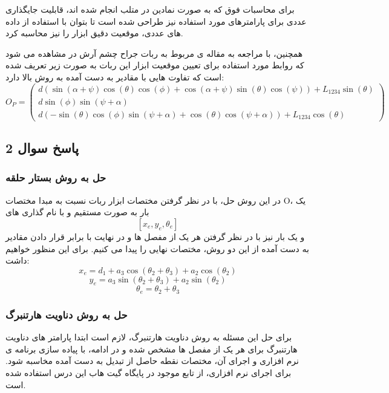 برای محاسبات فوق که به صورت نمادین در متلب انجام شده اند، قابلیت جایگذاری عددی برای پارامترهای مورد استفاده نیز طراحی شده است تا بتوان با استفاده از داده های عددی، موقعیت دقیق ابزار را نیز محاسبه کرد.

همچنین، با مراجعه به مقاله ی مربوط به ربات جراح چشم آرش در \cite{hassani2021kinematic} مشاهده می شود که روابط مورد استفاده برای تعیین موقعیت ابزار این ربات به صورت زیر تعریف شده است که تفاوت هایی با مقادیر به دست آمده به روش بالا دارد:
\[
O_P = 
\begin{pmatrix}
	d \left( \sin(\alpha + \psi) \cos(\theta) \cos(\phi) + \cos(\alpha + \psi) \sin(\theta) \cos(\psi) \right) + L_{1234} \sin(\theta) \\
	d \sin(\phi) \sin(\psi + \alpha) \\
	d \left( -\sin(\theta) \cos(\phi) \sin(\psi + \alpha) + \cos(\theta) \cos(\psi + \alpha) \right) + L_{1234} \cos(\theta)
\end{pmatrix}
\]


\subsection{ پاسخ سوال 2}
\subsubsection{حل به روش بستار حلقه}

در این روش حل، با در نظر گرفتن مختصات ابزار ربات نسبت به مبدا مختصات O، یک بار به صورت مستقیم و با نام گذاری های 
\[
[x_e, y_e, \theta_e]
\]
 و یک بار نیز با در نظر گرفتن هر یک از مفصل ها و در نهایت با برابر قرار دادن مقادیر به دست آمده از این دو روش، مختصات نهایی را پیدا می کنیم.
 برای این منظور خواهیم داشت:
 \[
 x_e = d_1 + a_3 \cos(\theta_2 + \theta_3) + a_2 \cos(\theta_2)
 \]
 \[
 y_e = a_3 \sin(\theta_2 + \theta_3) + a_2 \sin(\theta_2)
 \]
 \[
 \theta_e = \theta_2 + \theta_3
 \]
 
 \subsubsection{حل به روش دناویت هارتنبرگ}
 برای حل این مسئله به روش دناویت هارتنبرگ، لازم است ابتدا پارامتر های دناویت هارتنبرگ برای هر یک از مفصل ها مشخص شده و در ادامه، با پیاده سازی برنامه ی نرم افزاری و اجرای آن، مختصات نقطه حاصل از تبدیل به دست آمده مخاسبه شود. برای اجرای نرم افزاری، از تابع موجود در پایگاه گیت هاب این درس استفاده شده است.


